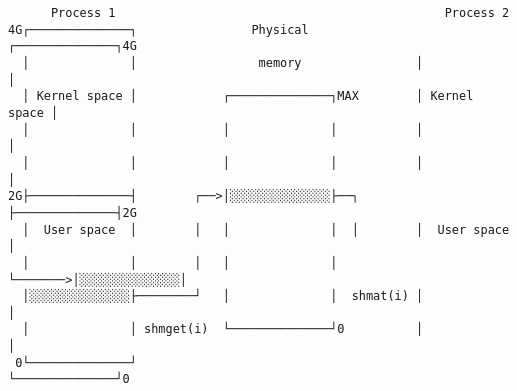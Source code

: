 \documentclass[varwidth=50em,crop]{standalone}
\begin{document}
\begin{verbatim}
      Process 1                                              Process 2
4G┌──────────────┐                Physical               ┌──────────────┐4G
  │              │                 memory                │              │
  │ Kernel space │            ┌──────────────┐MAX        │ Kernel space │
  │              │            │              │           │              │
  │              │            │              │           │              │
2G├──────────────┤        ┌──>│░░░░░░░░░░░░░░├──┐        ├──────────────┤2G
  │  User space  │        │   │              │  │        │  User space  │
  │              │        │   │              │  └───────>│░░░░░░░░░░░░░░│
  │░░░░░░░░░░░░░░├────────┘   │              │  shmat(i) │              │
  │              │ shmget(i)  └──────────────┘0          │              │
 0└──────────────┘                                       └──────────────┘0
\end{verbatim}
\end{document}
